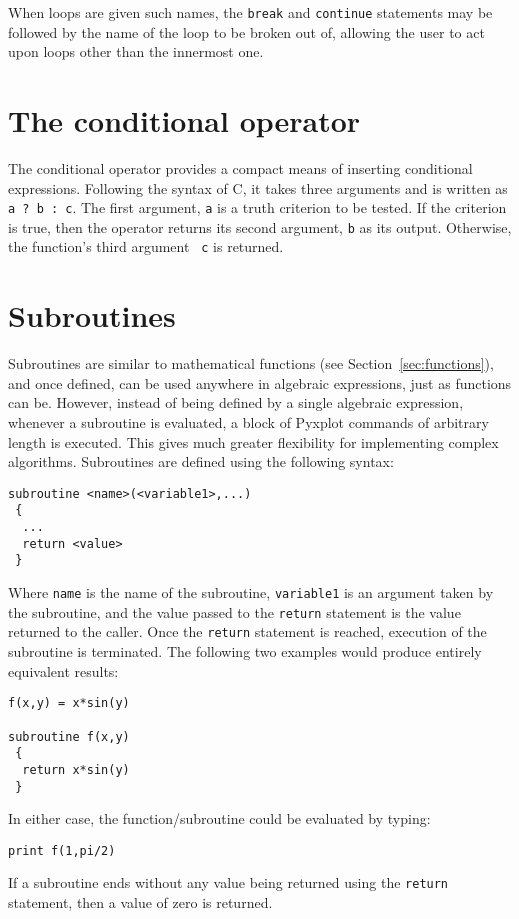 \noindent When loops are given such names, the {\tt break} and {\tt continue}
statements may be followed by the name of the loop to be broken out of,
allowing the user to act upon loops other than the innermost one.

\section{The conditional operator}
\label{sec:conditional_operator}

The conditional operator provides a compact means of inserting conditional
expressions.  Following the syntax of C, it takes three arguments and is
written as {\tt a ? b : c}. The first argument, {\tt a} is a truth criterion to
be tested. If the criterion is true, then the operator returns its second
argument, {\tt b} as its output. Otherwise, the function's third argument {\tt
c} is returned.

\vspace{2mm}


\section{Subroutines}
\label{sec:subroutines}

Subroutines are similar to mathematical functions (see
Section~\ref{sec:functions}), and once defined, can be used anywhere in
algebraic expressions, just as functions can be.  However, instead of being
defined by a single algebraic expression, whenever a subroutine is evaluated, a
block of Pyxplot commands of arbitrary length is executed. This gives much
greater flexibility for implementing complex algorithms. Subroutines are
defined using the following syntax:
\begin{verbatim}
subroutine <name>(<variable1>,...)
 {
  ...
  return <value>
 }
\end{verbatim}
Where {\tt name} is the name of the subroutine, {\tt variable1} is an argument
taken by the subroutine, and the value passed to the {\tt return} statement is
the value returned to the caller. Once the {\tt return} statement is reached,
execution of the subroutine is terminated. The following two examples would
produce entirely equivalent results:
\begin{verbatim}
f(x,y) = x*sin(y)

subroutine f(x,y)
 {
  return x*sin(y)
 }
\end{verbatim}
In either case, the function/subroutine could be evaluated by typing:
\begin{verbatim}
print f(1,pi/2)
\end{verbatim}
If a subroutine ends without any value being returned using the {\tt return}
statement, then a value of zero is returned.

